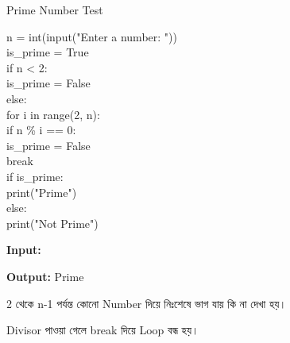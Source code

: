 \begin{codeoutputbox}{Prime Number Test}

\noindent
\begin{minipage}[t]{0.55\linewidth}
\codeheading

\begin{english}
\ttfamily
n = int(input("Enter a number: "))\\
is\_prime = True\\[0.5mm]
if n < 2:\\
\hspace*{4mm}is\_prime = False\\
else:\\
\hspace*{4mm}for i in range(2, n):\\
\hspace*{8mm}if n \% i == 0:\\
\hspace*{12mm}is\_prime = False\\
\hspace*{12mm}break\\[0.5mm]
if is\_prime:\\
\hspace*{4mm}print("Prime")\\
else:\\
\hspace*{4mm}print("Not Prime")
\end{english}

\end{minipage}
\hfill
\begin{minipage}[t]{0.41\linewidth}
\outputheading

\textbf{Input:}
\textenglish{}

\medskip

\textbf{Output:}
\textenglish{\ttfamily Prime}

\medskip

2 থেকে
\textenglish{\ttfamily n-1}
পর্যন্ত কোনো Number দিয়ে নিঃশেষে ভাগ যায় কি না দেখা হয়।

\medskip

Divisor পাওয়া গেলে
\textenglish{\ttfamily break}
দিয়ে Loop বন্ধ হয়।

\end{minipage}

\end{codeoutputbox}


